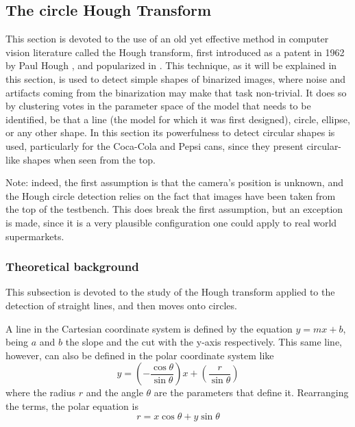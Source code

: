 \documentclass[../main.tex]{subfiles}
\begin{document}
\subsection{The circle Hough Transform}
This section is devoted to the use of an old yet effective method in computer vision literature called the Hough transform, first introduced as a patent in 1962 by Paul Hough \cite{hough1962patent}, and popularized in \cite{ballard1981generalizing_Hough}. This technique, as it will be explained in this section, is used to detect simple shapes of binarized images, where noise and artifacts coming from the binarization may make that task non-trivial. It does so by clustering votes in the parameter space of the model that needs to be identified, be that a line (the model for which it was first designed), circle, ellipse, or any other shape. In this section its powerfulness to detect circular shapes is used, particularly for the Coca-Cola and Pepsi cans, since they present circular-like shapes when seen from the top.

Note: indeed, the first assumption is that the camera's position is unknown, and the Hough circle detection relies on the fact that images have been taken from the top of the testbench. This does break the first assumption, but an exception is made, since it is a very plausible configuration one could apply to real world supermarkets. 

\subsubsection{Theoretical background}
This subsection is devoted to the study of the Hough transform applied to the detection of straight lines, and then moves onto circles.

A line in the Cartesian coordinate system is defined by the equation $y = mx + b$, being $a$ and $b$ the slope and the cut with the y-axis respectively. This same line, however, can also be defined in the polar coordinate system like
\begin{equation}
    y=\left(-\frac{\cos \theta}{\sin \theta}\right) x+\left(\frac{r}{\sin \theta}\right)
\end{equation}
where the radius $r$ and the angle $\theta$ are the parameters that define it. Rearranging the terms, the polar equation is 
\begin{equation} \label{eq:Hough_r}
    r = x \cos \theta + y \sin \theta
\end{equation}
\end{document}
